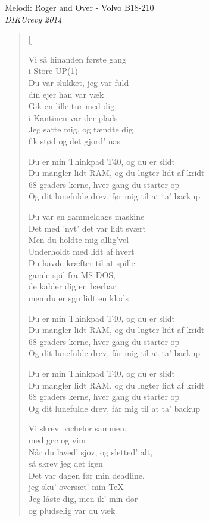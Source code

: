 {Melodi: Roger and Over - Volvo B18-210}\\[.2em]
{\small\itshape DIKUrevy 2014}
\begin{multicols}{2}
\settowidth{\versewidth}{Og dit lunefulde drev, før mig til at ta' backup}
\begin{verse}[\versewidth]

Vi så hinanden første gang\\
i Store UP(1)\\
Du var slukket, jeg var fuld -\\
din ejer han var væk\\
Gik en lille tur med dig,\\
i Kantinen var der plads\\
Jeg satte mig, og tændte dig\\
fik stød og det gjord' nas

Du er min Thinkpad T40, og du er slidt\\
Du mangler lidt RAM, og du lugter lidt af kridt\\
68 graders kerne, hver gang du starter op\\
Og dit lunefulde drev, før mig til at ta' backup

Du var en gammeldags maskine\\
Det med 'nyt' det var lidt svært\\
Men du holdte mig allig'vel\\
Underholdt med lidt af hvert\\
Du havde kræfter til at spille\\
gamle spil fra MS-DOS,\\
de kalder dig en bærbar\\
men du er sgu lidt en klods

Du er min Thinkpad T40, og du er slidt\\
Du mangler lidt RAM, og du lugter lidt af kridt\\
68 graders kerne, hver gang du starter op\\
Og dit lunefulde drev, får mig til at ta' backup


Du er min Thinkpad T40, og du er slidt\\
Du mangler lidt RAM, og du lugter lidt af kridt\\
68 graders kerne, hver gang du starter op\\
Og dit lunefulde drev, får mig til at ta' backup

Vi skrev bachelor sammen,\\
med gcc og vim\\
Når du laved' sjov, og sletted' alt,\\
så skrev jeg det igen\\
Det var dagen før min deadline,\\
jeg sku' oversæt' min TeX\\
Jeg låste dig, men ik' min dør\\
og pludselig var du væk


\end{verse}
\end{multicols}

